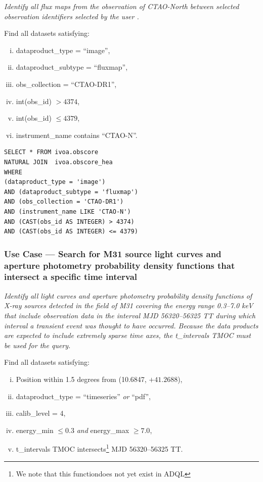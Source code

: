 {\em Identify all flux maps from the observation of CTAO-North between selected observation identifiers selected by the user .\/}

\medskip
\noindent Find all datasets satisfying:
\begin{enumerate}[(i)]
  \item dataproduct\_type = ``image'',
  \item dataproduct\_subtype = ``fluxmap'',
  \item obs\_collection = ``CTAO-DR1'',
  \item int(obs\_id) $> 4374$,
  \item int(obs\_id) $\leq 4379$,
  \item  instrument\_name contains ``CTAO-N''.
\end{enumerate}

\begin{verbatim}
SELECT * FROM ivoa.obscore
NATURAL JOIN  ivoa.obscore_hea
WHERE
(dataproduct_type = 'image')
AND (dataproduct_subtype = 'fluxmap')
AND (obs_collection = 'CTAO-DR1')
AND (instrument_name LIKE 'CTAO-N')
AND (CAST(obs_id AS INTEGER) > 4374)
AND (CAST(obs_id AS INTEGER) <= 4379)
\end{verbatim}


\subsubsection{Use Case --- Search for M31 source light curves and aperture photometry probability density functions that intersect a specific time interval}

{\em Identify all light curves and aperture photometry probability density functions of X-ray sources detected in the field of M31 covering the energy range 0.3--7.0 keV that include observation data in the interval MJD 56320--56325 TT during which interval a transient event was thought to have occurred.  Because the data products are expected to include extremely sparse time axes, the t\_intervals TMOC must be used for the query.\/}

\medskip
\noindent Find all datasets satisfying:
\begin{enumerate}[(i)]
  \item Position within 1.5 degrees from (10.6847, $+41.2688$),
  \item dataproduct\_type = ``timeseries'' {\em or\/} ``pdf'',
  \item calib\_level = 4,
  \item energy\_min $\leq 0.3$ {\em and\/} energy\_max $\geq 7.0$,
  \item t\_intervals TMOC intersects\footnote{We note that this functiondoes not yet exist in ADQL} MJD 56320--56325 TT.
\end{enumerate}


